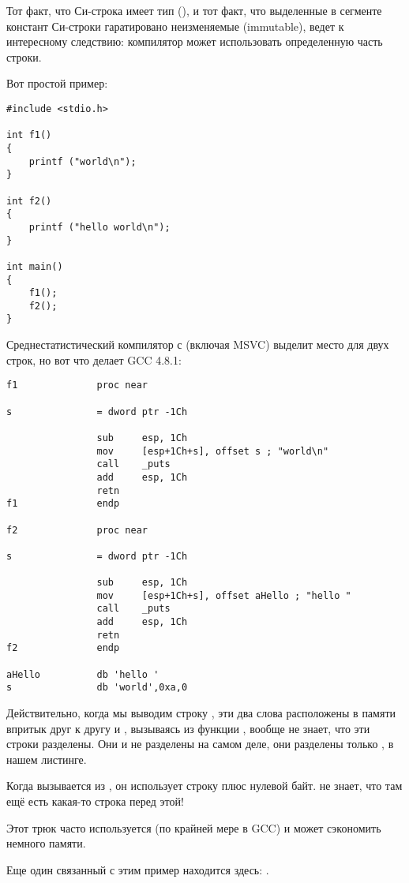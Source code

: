 \label{use_parts_of_C_strings}

Тот факт, что  Си-строка имеет тип  (), 
и тот факт, что выделенные в сегменте констант Си-строки гаратировано неизменяемые (immutable), 
ведет к интересному следствию: компилятор может использовать определенную часть строки.

Вот простой пример:

\begin{lstlisting}
#include <stdio.h>

int f1()
{
	printf ("world\n");
}

int f2()
{
	printf ("hello world\n");
}

int main()
{
	f1();
	f2();
}
\end{lstlisting}

Среднестатистический компилятор с \CCpp (включая MSVC) выделит место для двух строк, но вот что делает GCC 4.8.1:

\begin{lstlisting}[caption=GCC 4.8.1 + листинг в IDA]
f1              proc near

s               = dword ptr -1Ch

                sub     esp, 1Ch
                mov     [esp+1Ch+s], offset s ; "world\n"
                call    _puts
                add     esp, 1Ch
                retn
f1              endp

f2              proc near

s               = dword ptr -1Ch

                sub     esp, 1Ch
                mov     [esp+1Ch+s], offset aHello ; "hello "
                call    _puts
                add     esp, 1Ch
                retn
f2              endp

aHello          db 'hello '
s               db 'world',0xa,0
\end{lstlisting}

Действительно, когда мы выводим строку , 
эти два слова расположены в памяти впритык друг к другу и \puts, вызываясь из функции , вообще не знает,
что эти строки разделены. Они и не разделены на самом деле, они разделены
только , в нашем листинге.

Когда \puts вызывается из , он использует строку  плюс нулевой байт. \puts не знает, что там ещё есть какая-то строка перед этой!

Этот трюк часто используется (по крайней мере в GCC) и может сэкономить немного памяти.

Еще один связанный с этим пример находится здесь: .

